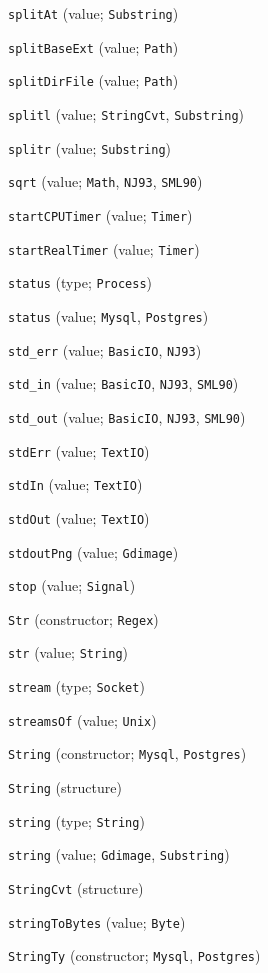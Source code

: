 \begin{description}
\item[] \verb"splitAt" (value; \verb"Substring")
\item[] \verb"splitBaseExt" (value; \verb"Path")
\item[] \verb"splitDirFile" (value; \verb"Path")
\item[] \verb"splitl" (value; \verb"StringCvt", \verb"Substring")
\item[] \verb"splitr" (value; \verb"Substring")
\item[] \verb"sqrt" (value; \verb"Math", \verb"NJ93", \verb"SML90")
\item[] \verb"startCPUTimer" (value; \verb"Timer")
\item[] \verb"startRealTimer" (value; \verb"Timer")
\item[] \verb"status" (type; \verb"Process")
\item[] \verb"status" (value; \verb"Mysql", \verb"Postgres")
\item[] \verb"std_err" (value; \verb"BasicIO", \verb"NJ93")
\item[] \verb"std_in" (value; \verb"BasicIO", \verb"NJ93", \verb"SML90")
\item[] \verb"std_out" (value; \verb"BasicIO", \verb"NJ93", \verb"SML90")
\item[] \verb"stdErr" (value; \verb"TextIO")
\item[] \verb"stdIn" (value; \verb"TextIO")
\item[] \verb"stdOut" (value; \verb"TextIO")
\item[] \verb"stdoutPng" (value; \verb"Gdimage")
\item[] \verb"stop" (value; \verb"Signal")
\item[] \verb"Str" (constructor; \verb"Regex")
\item[] \verb"str" (value; \verb"String")
\item[] \verb"stream" (type; \verb"Socket")
\item[] \verb"streamsOf" (value; \verb"Unix")
\item[] \verb"String" (constructor; \verb"Mysql", \verb"Postgres")
\item[] \verb"String" (structure)
\item[] \verb"string" (type; \verb"String")
\item[] \verb"string" (value; \verb"Gdimage", \verb"Substring")
\item[] \verb"StringCvt" (structure)
\item[] \verb"stringToBytes" (value; \verb"Byte")
\item[] \verb"StringTy" (constructor; \verb"Mysql", \verb"Postgres")

\end{description}
